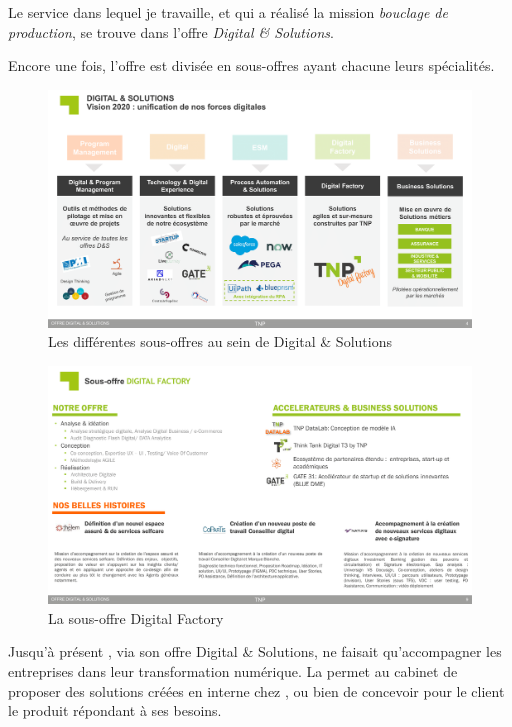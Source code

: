 Le service \df dans lequel je travaille, et qui a réalisé la mission \emph{bouclage de production}, se trouve dans l'offre \emph{Digital \& Solutions}.

Encore une fois, l'offre est divisée en sous-offres ayant chacune leurs spécialités.

\begin{figure}[H]
    \centering
    \includegraphics[width=1\linewidth]{img/Offre digital and solutions TNP_20200131-05.png}
    \caption{Les différentes sous-offres au sein de Digital \& Solutions}
\end{figure}

\begin{figure}[H]
    \centering
    \includegraphics[width=1\linewidth]{img/Offre digital and solutions TNP_20200131-10.png}
    \caption{La sous-offre Digital Factory}
\end{figure}

Jusqu'à présent \entreprise, via son offre Digital \& Solutions, ne faisait qu'accompagner les entreprises dans leur transformation numérique. La \df permet au cabinet de proposer des solutions créées en interne chez \entreprise, ou bien de concevoir pour le client le produit répondant à ses besoins.

